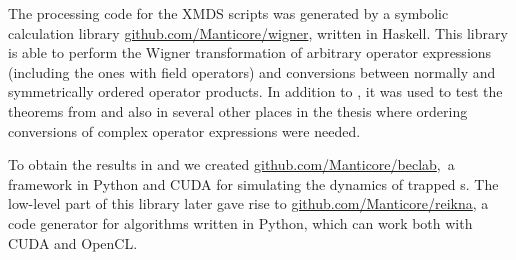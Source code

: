 The processing code for the XMDS scripts was generated by a symbolic calculation library \href{http://github.com/Manticore/wigner}{github.com/Manticore/wigner}, written in Haskell.
This library is able to perform the Wigner transformation of arbitrary operator expressions (including the ones with field operators) and conversions between normally and symmetrically ordered operator products.
In addition to , it was used to test the theorems from  and also in several other places in the thesis where ordering conversions of complex operator expressions were needed.

To obtain the results in  and  we created \href{http://github.com/Manticore/beclab}{github.com/Manticore/beclab}, a framework in Python and CUDA for simulating the dynamics of trapped s.
The low-level part of this library later gave rise to \href{http://github.com/Manticore/reikna}{github.com/Manticore/reikna}, a code generator for  algorithms written in Python, which can work both with CUDA and OpenCL.
